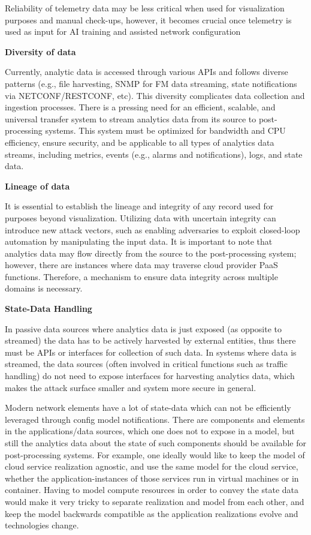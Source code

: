 \documentclass[11pt,sigconf]{iabart}
\begin{document}
Reliability of telemetry data may be less critical when used for visualization purposes and manual check-ups, however, it becomes crucial once telemetry is used as input for AI training and assisted network configuration

\textbf{Diversity of data} 

Currently, analytic data is accessed through various APIs and follows diverse patterns (e.g., file harvesting, SNMP for FM data streaming, state notifications via NETCONF/RESTCONF, etc). This diversity complicates data collection and ingestion processes. There is a pressing need for an efficient, scalable, and universal transfer system to stream analytics data from its source to post-processing systems. This system must be optimized for bandwidth and CPU efficiency, ensure security, and be applicable to all types of analytics data streams, including metrics, events (e.g., alarms and notifications), logs, and state data.

\textbf{Lineage of data}

It is essential to establish the lineage and integrity of any record used for purposes beyond visualization. Utilizing data with uncertain integrity can introduce new attack vectors, such as enabling adversaries to exploit closed-loop automation by manipulating the input data. It is important to note that analytics data may flow directly from the source to the post-processing system; however, there are instances where data may traverse cloud provider PaaS functions. Therefore, a mechanism to ensure data integrity across multiple domains is necessary.

\textbf{State-Data Handling}

In passive data sources where analytics data is just exposed (as opposite to streamed) the data has to be actively harvested by external entities, thus there must be APIs or interfaces for collection of such data. In systems where data is streamed, the data sources (often involved in critical functions such as traffic handling) do not need to expose interfaces for harvesting analytics data, which makes the attack surface smaller and system more secure in general.

Modern network elements have a lot of state-data which can not be efficiently leveraged through config model notifications. There are components and elements in the applications/data sources, which one does not to expose in a model, but still the analytics data about the state of such components should be available for post-processing systems. For example, one ideally would like to keep the model of cloud service realization agnostic, and use the same model for the cloud service, whether the application-instances of those services run in virtual machines or in container. Having to model compute resources in order to convey the state data would make it very tricky to separate realization and model from each other, and keep the model backwards compatible as the application realizations evolve and technologies change.
\end{document}
